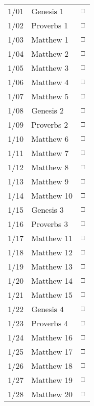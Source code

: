\documentclass[10pt,landscape,letterpaper]{article}
\begin{document}
\begin{multicols}{5}
\begin{tabular}{p{0.3in}p{0.75in}p{0.4in}}
1/01 & \textcolor[rgb]{0.98,0.00,0.00}{Genesis 1} & \textcolor[rgb]{0.98,0.00,0.00}{$\boxempty$} \\
1/02 & \textcolor[rgb]{0.98,0.00,0.00}{Proverbs 1} & \textcolor[rgb]{0.98,0.00,0.00}{$\boxempty$} \\
1/03 & Matthew 1 & $\boxempty$ \\
1/04 & Matthew 2 & $\boxempty$ \\
1/05 & Matthew 3 & $\boxempty$ \\
1/06 & Matthew 4 & $\boxempty$ \\
1/07 & Matthew 5 & $\boxempty$ \\

1/08 & \textcolor[rgb]{0.98,0.00,0.00}{Genesis 2} & \textcolor[rgb]{0.98,0.00,0.00}{$\boxempty$} \\
1/09 & \textcolor[rgb]{0.98,0.00,0.00}{Proverbs 2} & \textcolor[rgb]{0.98,0.00,0.00}{$\boxempty$} \\
1/10 & Matthew 6 & $\boxempty$ \\
1/11 & Matthew 7 & $\boxempty$ \\
1/12 & Matthew 8 & $\boxempty$ \\
1/13 & Matthew 9 & $\boxempty$ \\
1/14 & Matthew 10 & $\boxempty$ \\

1/15 & \textcolor[rgb]{0.98,0.00,0.00}{Genesis 3} & \textcolor[rgb]{0.98,0.00,0.00}{$\boxempty$} \\
1/16 & \textcolor[rgb]{0.98,0.00,0.00}{Proverbs 3} & \textcolor[rgb]{0.98,0.00,0.00}{$\boxempty$} \\
1/17 & Matthew 11 & $\boxempty$ \\
1/18 & Matthew 12 & $\boxempty$ \\
1/19 & Matthew 13 & $\boxempty$ \\
1/20 & Matthew 14 & $\boxempty$ \\
1/21 & Matthew 15 & $\boxempty$ \\

1/22 & \textcolor[rgb]{0.98,0.00,0.00}{Genesis 4} & \textcolor[rgb]{0.98,0.00,0.00}{$\boxempty$} \\
1/23 & \textcolor[rgb]{0.98,0.00,0.00}{Proverbs 4} & \textcolor[rgb]{0.98,0.00,0.00}{$\boxempty$} \\
1/24 & Matthew 16 & $\boxempty$ \\
1/25 & Matthew 17 & $\boxempty$ \\
1/26 & Matthew 18 & $\boxempty$ \\
1/27 & Matthew 19 & $\boxempty$ \\
1/28 & Matthew 20 & $\boxempty$ \\


\end{tabular}
\end{multicols}
\end{document}
